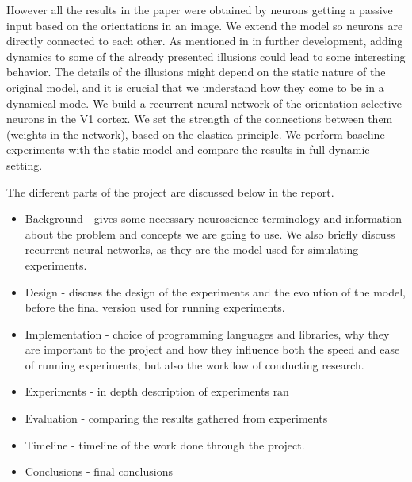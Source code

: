However all the results in the paper were obtained by neurons getting a passive input based on the orientations in an image. We extend the model so neurons are directly connected to each other. As mentioned in \cite{keemink2015unified} in further development, adding dynamics to some of the already presented illusions could lead to some interesting behavior. The details of the illusions might depend on the static nature of the original model, and it is crucial that we understand how they come to be in a dynamical mode. We build a recurrent neural network of the orientation selective neurons in the V1 cortex. We set the strength of the connections between them (weights in the network), based on the elastica principle. We perform baseline experiments with the static model and compare the results in full dynamic setting.

The different parts of the project are discussed below in the report.
\begin{itemize}
  \item Background - gives some necessary neuroscience terminology and information about the problem and concepts we are going to use. We also briefly discuss recurrent neural networks, as they are the model used for simulating experiments.
  \item Design - discuss the design of the experiments and the evolution of the model, before the final version used for running experiments.
  \item Implementation - choice of programming languages and libraries, why they are important to the project and how they influence both the speed and ease of running experiments, but also the workflow of conducting research.
  \item Experiments - in depth description of experiments ran
  \item Evaluation - comparing the results gathered from experiments
  \item Timeline - timeline of the work done through the project.
  \item Conclusions - final conclusions
\end{itemize}





